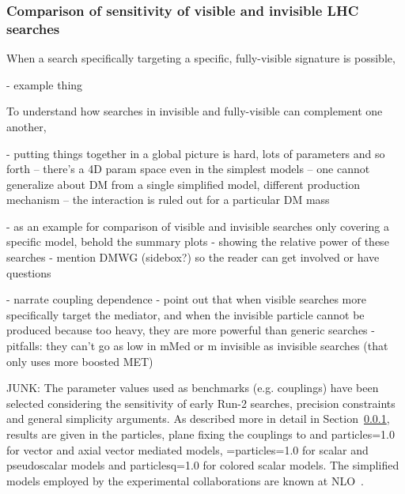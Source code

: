 

\subsubsection{Comparison of sensitivity of visible and invisible LHC searches}
\label{sub:comparisonVisibleInvisible}

When a search specifically targeting a specific, fully-visible signature is possible, 

- example thing

To understand how searches in invisible and fully-visible can complement one another,


- putting things together in a global picture is hard, lots of parameters and so forth
-- there's a 4D param space even in the simplest models
-- one cannot generalize about DM from a single simplified model, different production mechanism
-- the interaction is ruled out for a particular DM mass

- as an example for comparison of visible and invisible searches only covering a specific model, behold the summary plots
- showing the relative power of these searches
- mention DMWG (sidebox?) so the reader can get involved or have questions

- narrate coupling dependence
- point out that when visible searches more specifically target the mediator, and when the invisible particle cannot be produced because too heavy, they are more powerful than generic searches
- pitfalls: they can't go as low in mMed or m invisible as invisible searches (that only uses more boosted MET)


JUNK: The parameter values used as benchmarks (e.g. couplings) have been selected considering the sensitivity of early Run-2 searches, precision constraints and general simplicity arguments. As described more in detail in Section~\ref{sub:comparisonVisibleInvisible}, results are given in the \mdm particles, \mmed  plane fixing the couplings to  and \gdm particles=1.0 for vector and axial vector mediated models, \gq=\gdm particles=1.0 for scalar and pseudoscalar models and \gdm particlesq=1.0 for colored scalar models. The simplified models employed by the experimental collaborations are known at NLO~\cite{Neubert:2015fka,Haisch:2013ata,Backovic:2015soa}. 


